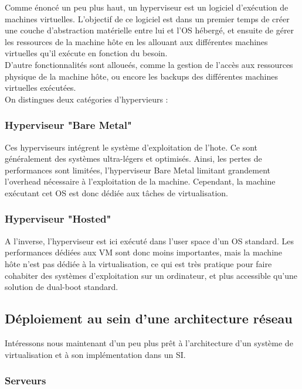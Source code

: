 Comme énoncé un peu plus haut, un hyperviseur est un logiciel d'exécution de machines virtuelles. L'objectif de ce logiciel est dans un premier temps de créer une couche d'abstraction matérielle entre lui et l'OS hébergé, et ensuite de gérer les ressources de la machine hôte en les allouant aux différentes machines virtuelles qu'il exécute en fonction du besoin.\\
D'autre fonctionnalités sont alloueés, comme la gestion de l'accès aux ressources physique de la machine hôte, ou encore les backups des différentes machines virtuelles exécutées.\\
On distingues deux catégories d'hypervieurs :\\

\subsubsection{Hyperviseur "Bare Metal"}

Ces hyperviseurs intégrent le système d'exploitation de l'hote. Ce sont généralement des systèmes ultra-légers et optimisés. Ainsi, les pertes de performances sont limitées, l'hyperviseur Bare Metal limitant grandement l'overhead nécessaire à l'exploitation de la machine. Cependant, la machine exécutant cet OS est donc dédiée aux tâches de virtualisation.

\subsubsection{Hyperviseur "Hosted"}

A l'inverse, l'hyperviseur est ici exécuté dans l'user space d'un OS standard. Les performances dédiées aux VM sont donc moins importantes, mais la machine hôte n'est pas dédiée à la virtualisation, ce qui est très pratique pour faire cohabiter des systèmes d'exploitation sur un ordinateur, et plus accessible qu'une solution de dual-boot standard.

\subsection{Déploiement au sein d'une architecture réseau}

Intéressons nous maintenant d'un peu plus prêt à l'architecture d'un système de virtualisation et à son implémentation dans un SI.

\subsubsection{Serveurs}

